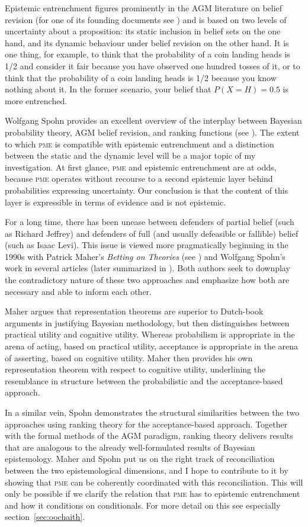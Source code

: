 \documentclass[phd,12pt,oneside]{ubcthesis}
\begin{document}
Epistemic entrenchment figures prominently in the AGM literature on
belief revision (for one of its founding documents see
) and is based on two levels of uncertainty about a
proposition: its static inclusion in belief sets on the one hand, and
its dynamic behaviour under belief revision on the other hand. It is
one thing, for example, to think that the probability of a coin
landing heads is 1/2 and consider it fair because you have observed
one hundred tosses of it, or to think that the probability of a coin
landing heads is 1/2 because you know nothing about it. In the former
scenario, your belief that $P(X=H)=0.5$ is more entrenched.

Wolfgang Spohn provides an excellent overview of the interplay between
Bayesian probability theory, AGM belief revision, and ranking
functions (see ). The extent to which \textsc{pme}
is compatible with epistemic entrenchment and a distinction between
the static and the dynamic level will be a major topic of my
investigation. At first glance, \textsc{pme} and epistemic
entrenchment are at odds, because \textsc{pme} operates without
recourse to a second epistemic layer behind probabilities expressing
uncertainty. Our conclusion is that the content of this layer is
expressible in terms of evidence and is not epistemic.

For a long time, there has been unease between defenders of partial
belief (such as Richard Jeffrey) and defenders of full (and usually
defeasible or fallible) belief (such as Isaac Levi). This issue is
viewed more pragmatically beginning in the 1990s with Patrick Maher's
\emph{Betting on Theories} (see ) and Wolfgang
Spohn's work in several articles (later summarized in
). Both authors seek to downplay the contradictory
nature of these two approaches and emphasize how both are necessary
and able to inform each other.

Maher argues that representation theorems are superior to Dutch-book
arguments in justifying Bayesian methodology, but then distinguishes
between practical utility and cognitive utility. Whereas probabilism
is appropriate in the arena of acting, based on practical utility,
acceptance is appropriate in the arena of asserting, based on
cognitive utility. Maher then provides his own representation theorem
with respect to cognitive utility, underlining the resemblance in
structure between the probabilistic and the acceptance-based approach.

In a similar vein, Spohn demonstrates the structural similarities
between the two approaches using ranking theory for the
acceptance-based approach. Together with the formal methods of the AGM
paradigm, ranking theory delivers results that are analogous to the
already well-formulated results of Bayesian epistemology. Maher and
Spohn put us on the right track of reconciliation between the two
epistemological dimensions, and I hope to contribute to it by showing
that \textsc{pme} can be coherently coordinated with this
reconciliation. This will only be possible if we clarify the relation
that \textsc{pme} has to epistemic entrenchment and how it conditions
on conditionals. For more detail on this see especially
section~\ref{sec:oochaith}.
\end{document}
